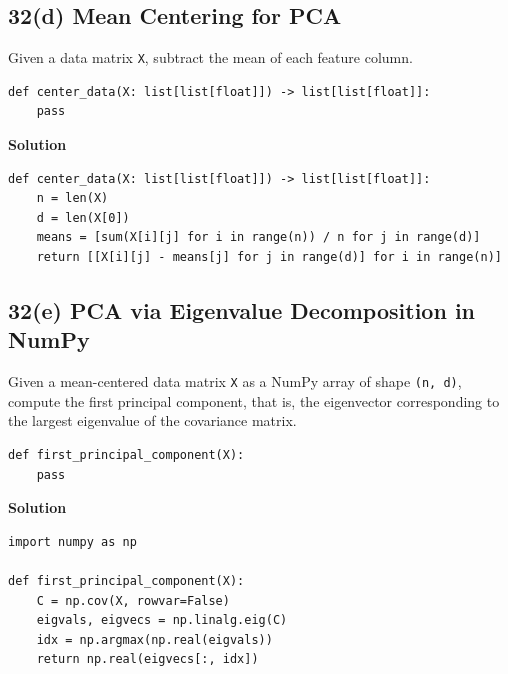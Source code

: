 \documentclass[11pt]{article}
\begin{document}
\subsection*{32(d) Mean Centering for PCA}
Given a data matrix \texttt{X}, subtract the mean of each feature column.

\begin{lstlisting}
def center_data(X: list[list[float]]) -> list[list[float]]:
    pass
\end{lstlisting}

\medskip
\noindent\textbf{Solution}
\begin{lstlisting}
def center_data(X: list[list[float]]) -> list[list[float]]:
    n = len(X)
    d = len(X[0])
    means = [sum(X[i][j] for i in range(n)) / n for j in range(d)]
    return [[X[i][j] - means[j] for j in range(d)] for i in range(n)]
\end{lstlisting}

\subsection*{32(e) PCA via Eigenvalue Decomposition in NumPy}
Given a mean-centered data matrix \texttt{X} as a NumPy array of shape \texttt{(n, d)}, compute the first principal component, that is, the eigenvector corresponding to the largest eigenvalue of the covariance matrix.

\begin{lstlisting}
def first_principal_component(X):
    pass
\end{lstlisting}

\medskip
\noindent\textbf{Solution}
\begin{lstlisting}
import numpy as np

def first_principal_component(X):
    C = np.cov(X, rowvar=False)
    eigvals, eigvecs = np.linalg.eig(C)
    idx = np.argmax(np.real(eigvals))
    return np.real(eigvecs[:, idx])
\end{lstlisting}
\end{document}
